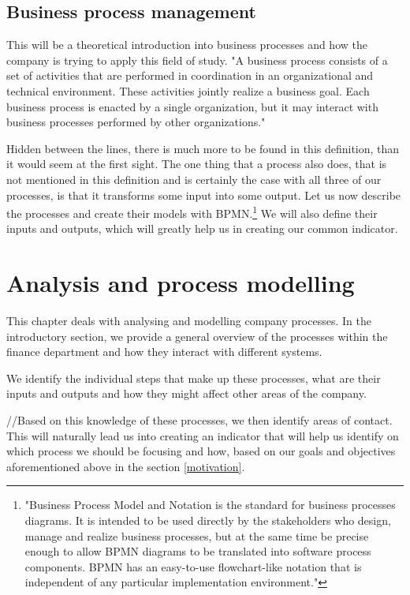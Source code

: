 \documentclass[12pt,oneside]{fithesis2}
\begin{document}
\section{Business process management}
This will be a theoretical introduction into business processes and how the company is trying to apply this field of study.
"A business process consists of a set of activities that are performed in coordination in an organizational and technical environment. These activities jointly realize a business goal. Each business process is enacted by a single organization, but it may interact with business processes performed by other organizations."\cite{weske2007business}
\par
Hidden between the lines, there is much more to be found in this definition, than it would seem at the first sight. The one thing that a process also does, that is not mentioned in this definition and is certainly the case with all three of our processes, is that it transforms some input into some output. Let us now describe the processes and create their models with BPMN.\footnote{"Business Process Model and Notation is the standard for business processes diagrams. It is intended to be used directly by the stakeholders who design, manage and realize business processes, but at the same time be precise enough to allow BPMN diagrams to be translated into software process components. BPMN has an easy-to-use flowchart-like notation that is independent of any particular implementation environment."\cite{bpmn}} We will also define their inputs and outputs, which will greatly help us in creating our common indicator.

\chapter{Analysis and process modelling}
This chapter deals with analysing and modelling company processes. In the introductory section, we provide a general overview of the processes within the finance department and how they interact with different systems.

We identify the individual steps that make up these processes, what are their inputs and outputs and how they might affect other areas of the company.

//Based on this knowledge of these processes, we then identify areas of contact. This will naturally lead us into creating an indicator that will help us identify on which process we should be focusing and how, based on our goals and objectives aforementioned above in the section \ref{motivation}.
\end{document}
